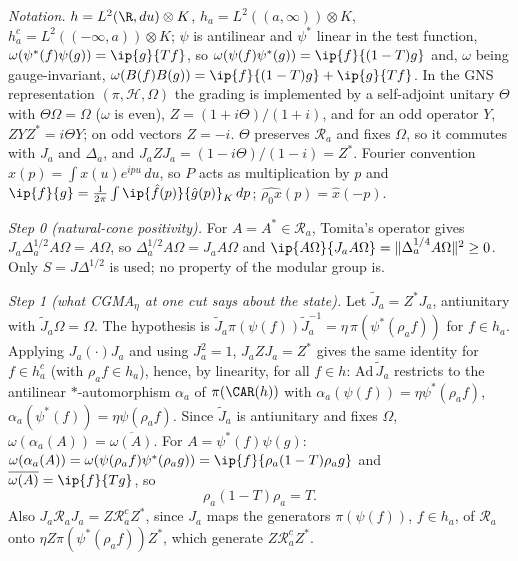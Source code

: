 \emph{Notation.} $h = L^{2}(\R, du)\otimes K$, $h_{a} = L^{2}((a, \infty))\otimes K$, $h_{a}^{c} = L^{2}((-\infty, a))\otimes K$; $\psi$ is antilinear and $\psi^{*}$ linear in the test function, $\omega(\psi^{*}(f)\psi(g)) = \ip{g}{Tf}$, so $\omega(\psi(f)\psi^{*}(g)) = \ip{f}{(1 - T)g}$ and, $\omega$ being gauge-invariant, $\omega(B(f)B(g)) = \ip{f}{(1 - T)g} + \ip{g}{Tf}$. In the GNS representation $(\pi, \mathcal{H}, \Omega)$ the grading is implemented by a self-adjoint unitary $\Theta$ with $\Theta\Omega = \Omega$ ($\omega$ is even), $Z = (1 + i\Theta)/(1 + i)$, and for an odd operator $Y$, $ZYZ^{*} = i\Theta Y$; on odd vectors $Z = -i$. $\Theta$ preserves $\mathcal{R}_{a}$ and fixes $\Omega$, so it commutes with $J_{a}$ and $\Delta_{a}$, and $J_{a}ZJ_{a} = (1 - i\Theta)/(1 - i) = Z^{*}$. Fourier convention $\hat x(p) = \int x(u)e^{ipu}\,du$, so $P$ acts as multiplication by $p$ and $\ip{f}{g} = \tfrac{1}{2\pi}\int \ip{\hat f(p)}{\hat g(p)}_{K}\,dp$; $\widehat{\rho_{0}x}(p) = \hat x(-p)$.

\emph{Step 0 (natural-cone positivity).} For $A = A^{*} \in \mathcal{R}_{a}$, Tomita's operator gives $J_{a}\Delta_{a}^{1/2}A\Omega = A\Omega$, so $\Delta_{a}^{1/2}A\Omega = J_{a}A\Omega$ and $\ip{A\Omega}{J_{a}A\Omega} = \|\Delta_{a}^{1/4}A\Omega\|^{2} \ge 0$. Only $S = J\Delta^{1/2}$ is used; no property of the modular group is.

\emph{Step 1 (what CGMA$_{\eta}$ at one cut says about the state).} Let $\tilde J_{a} = Z^{*}J_{a}$, antiunitary with $\tilde J_{a}\Omega = \Omega$. The hypothesis is $\tilde J_{a}\pi(\psi(f))\tilde J_{a}^{-1} = \eta\,\pi(\psi^{*}(\rho_{a}f))$ for $f \in h_{a}$. Applying $J_{a}(\cdot)J_{a}$ and using $J_{a}^{2} = 1$, $J_{a}ZJ_{a} = Z^{*}$ gives the same identity for $f \in h_{a}^{c}$ (with $\rho_{a}f \in h_{a}$), hence, by linearity, for all $f \in h$: $\mathrm{Ad}\,\tilde J_{a}$ restricts to the antilinear $*$-automorphism $\alpha_{a}$ of $\pi(\CAR(h))$ with $\alpha_{a}(\psi(f)) = \eta\psi^{*}(\rho_{a}f)$, $\alpha_{a}(\psi^{*}(f)) = \eta\psi(\rho_{a}f)$. Since $\tilde J_{a}$ is antiunitary and fixes $\Omega$, $\omega(\alpha_{a}(A)) = \overline{\omega(A)}$. For $A = \psi^{*}(f)\psi(g)$: $\omega(\alpha_{a}(A)) = \omega(\psi(\rho_{a}f)\psi^{*}(\rho_{a}g)) = \ip{f}{\rho_{a}(1 - T)\rho_{a}g}$ and $\overline{\omega(A)} = \ip{f}{Tg}$, so
\[ \rho_{a}(1 - T)\rho_{a} = T. \tag{1} \]
Also $J_{a}\mathcal{R}_{a}J_{a} = Z\mathcal{R}_{a}^{c}Z^{*}$, since $J_{a}$ maps the generators $\pi(\psi(f))$, $f \in h_{a}$, of $\mathcal{R}_{a}$ onto $\eta Z\pi(\psi^{*}(\rho_{a}f))Z^{*}$, which generate $Z\mathcal{R}_{a}^{c}Z^{*}$.

